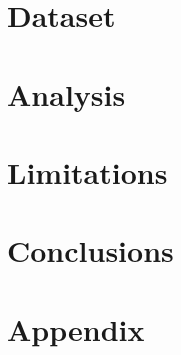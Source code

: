 
\section{Dataset}


\section{Analysis}


\section{Limitations}


\section{Conclusions}

\appendix

\section{Appendix}

\begin{acks}
\end{acks}
